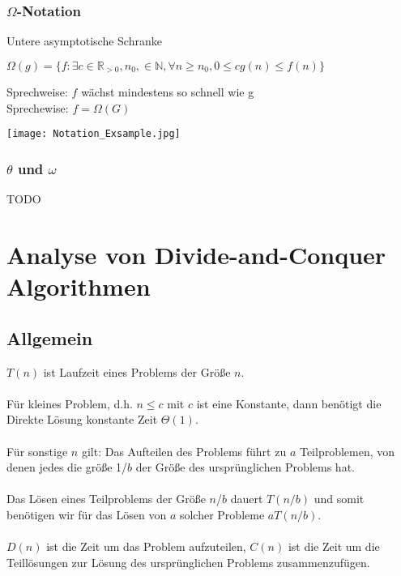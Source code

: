 		\subsubsection{$\Omega$-Notation}
			Untere asymptotische Schranke
			\begin{center}
				$\Omega(g) = \{f: \exists c \in \mathbb{R}_{>0}, n_0 , \in \mathbb{N}, \forall n \geq n_0 , 0 \leq c g(n) \leq f(n)\}$
			\end{center}
			Sprechweise: $f$ wächst mindestens so schnell wie g \\
			Sprechewise: $f = \Omega(G)$ \\

			\begin{center}
				\texttt{[image: Notation\_Exsample.jpg]}
			\end{center}


		\subsubsection{$\theta$ und $\omega$}
			TODO



\newpage
\section{Analyse von Divide-and-Conquer Algorithmen}
	\subsection{Allgemein}
		$T(n)$ ist Laufzeit eines Problems der Grö\ss e $n$. \\ \\
		\noindent Für kleines Problem, d.h. $n \leq c$ mit $c$ ist eine Konstante, dann benötigt 
		die Direkte Lösung konstante Zeit $\Theta (1)$. \\ \\
		\noindent Für sonstige $n$ gilt: Das Aufteilen des Problems führt zu $a$ Teilproblemen, 
		von denen jedes die grö\ss e 1/$b$ der Grö\ss e des ursprünglichen Problems hat. \\ \\
		\noindent Das Lösen eines Teilproblems der Grö\ss e $n$/$b$ dauert $T(n/b)$ und somit 
		benötigen wir für das Lösen von $a$ solcher Probleme $aT(n/b)$. \\ \\
		\noindent $D(n)$ ist die Zeit um das Problem aufzuteilen, $C(n)$ ist die Zeit um die 
		Teillösungen zur Lösung des ursprünglichen Problems zusammenzufügen. \\

